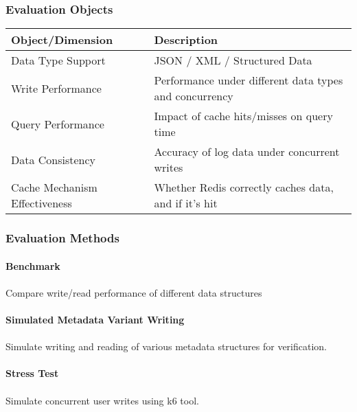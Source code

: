 \documentclass{article}
\begin{document}
\subsubsection{Evaluation Objects}

\begin{tabular}{|l|l|}
\hline
\textbf{Object/Dimension} & \textbf{Description} \\
\hline
Data Type Support & JSON / XML / Structured Data \\
Write Performance & Performance under different data types and concurrency \\
Query Performance & Impact of cache hits/misses on query time \\
Data Consistency & Accuracy of log data under concurrent writes \\
Cache Mechanism Effectiveness & Whether Redis correctly caches data, and if it's hit \\
\hline
\end{tabular}

\subsubsection{Evaluation Methods}

\paragraph{Benchmark}
\paragraph{}
Compare write/read performance of different data structures 

\paragraph{Simulated Metadata Variant Writing}
\paragraph{}
Simulate writing and reading of various metadata structures for verification.

\paragraph{Stress Test}
\paragraph{}
Simulate concurrent user writes using k6 tool.
\end{document}
